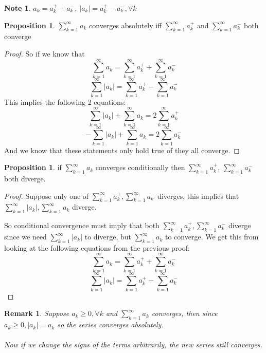 \documentclass[12pt]{article}
\theoremstyle{plain}
\newtheorem*{remark}{Remark}
\newtheorem*{note}{Note}
\theoremstyle{definition}
\newtheorem{proposition}[theorem]{Proposition}
\begin{document}
\begin{note}
	$a_k = a_k^+ + a_k^-$, $|a_k| = a_k^+ - a_k^-, \forall k$
\end{note}

\begin{proposition}
	$\sum^\infty_{k=1} a_k$ converges absolutely iff $\sum^\infty_{k=1} a_k^+$ and $\sum^\infty_{k=1} a_k^-$ both converge
\end{proposition}

\begin{proof}
	So if we know that
	$$\sum^\infty_{k=1} a_k = \sum^\infty_{k=1} a_k^+ + \sum^\infty_{k=1} a_k^-$$
	$$\sum^\infty_{k=1} |a_k| = \sum^\infty_{k=1} a_k^+ - \sum^\infty_{k=1} a_k^-$$
	This implies the following 2 equations:
	$$\sum^\infty_{k=1} |a_k| + \sum^\infty_{k=1} a_k = 2\sum^\infty_{k=1} a_k^+$$
	$$-\sum^\infty_{k=1} |a_k| + \sum^\infty_{k=1} a_k = 2\sum^\infty_{k=1} a_k^-$$
	And we know that these statements only hold true of they all converge.
\end{proof}


\begin{proposition}
	if $\sum^\infty_{k=1} a_k$ converges conditionally then $\sum^\infty_{k=1} a_k^+$, $\sum^\infty_{k=1} a_k^-$ both diverge.
\end{proposition}

\begin{proof}
	Suppose only one of $\sum^\infty_{k=1} a_k^+, \sum^\infty_{k=1} a_k^-$ diverges, this implies that $\sum^\infty_{k=1} |a_k|, \sum^\infty_{k=1} a_k$ diverge.
	
	So conditional convergence must imply that both $\sum^\infty_{k=1} a_k^+, \sum^\infty_{k=1} a_k^-$ diverge since we need $\sum^\infty_{k=1} |a_k|$ to diverge, but $\sum^\infty_{k=1} a_k$ to converge. We get this from looking at the following equations from the previous proof:
	$$\sum^\infty_{k=1} a_k = \sum^\infty_{k=1} a_k^+ + \sum^\infty_{k=1} a_k^-$$
	$$\sum^\infty_{k=1} |a_k| = \sum^\infty_{k=1} a_k^+ - \sum^\infty_{k=1} a_k^-$$
\end{proof}

\begin{remark}
	Suppose $a_k \geq 0, \forall k$ and $\sum^\infty_{k=1} a_k$ converges, then since $a_k \geq 0, |a_k| = a_k$ so the series converges absolutely.\\
	\\
	Now if we change the signs of the terms arbitrarily, the new series still converges.
\end{remark}
\end{document}
